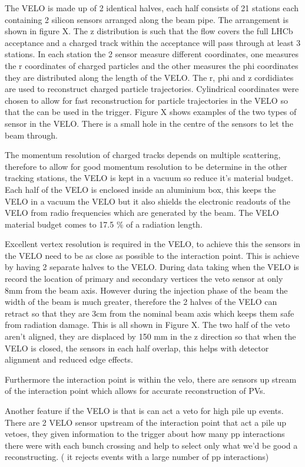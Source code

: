 The VELO is made up of 2 identical halves, each half consists of 21 stations each containing 2 silicon sensors arranged along the beam pipe. The arrangement is shown in figure X. The z distribution is such that the flow covers the full LHCb acceptance and a charged track within the acceptance will pass through at least 3 stations. In each station the 2 sensor measure different coordinates, one measures the r coordinates of charged particles and the other measures the phi coordinates they are distributed along the length of the VELO. The r, phi and z cordidiates are used to reconstruct charged particle trajectories. Cylindrical coordinates were chosen to allow for fast reconstruction for particle trajectories in the VELO so that the can be used in the trigger. Figure X shows examples of the two types of sensor in the VELO. There is a small hole in the centre of the sensors to let the beam through.

The momentum resolution of charged tracks depends on multiple scattering, therefore to allow for good momentum resolution to be determine in the other tracking stations, the VELO is kept in a vacuum so reduce it’s material budget. Each half of the VELO is enclosed inside an aluminium box, this keeps the VELO in a  vacuum the VELO but it also shields the electronic readouts of the VELO from radio frequencies which are generated by the beam. The VELO material budget comes to 17.5 $\%$ of a radiation length.

Excellent vertex resolution is required in the VELO, to achieve this the sensors in the VELO need to be as close as possible to the interaction point. This is achieve by having 2 separate halves to the VELO. During data taking when the VELO is record the location of primary and secondary vertices the veto sensor at only 8mm from the beam axis. However during the injection phase of the beam the width of the beam is much greater, therefore the 2 halves of the VELO can retract so that they are 3cm from the nominal beam axis which keeps them safe from radiation damage. This is all shown in Figure X. The two half of the veto aren’t aligned, they are displaced by 150 mm in the z direction so that when the VELO is closed, the sensors in each half overlap, this helps with detector alignment and reduced edge effects.


Furthermore the interaction point is within the velo, there are sensors up stream of the interaction point which allows for accurate reconstruction of PVs.


Another feature if the VELO is that is can act a veto for high pile up events. There are 2 VELO sensor upstream of the interaction point that act a pile up vetoes, they given information to the trigger about how many pp interactions there were with each bunch crossing and help to select only what we’d be good a reconstructing. ( it rejects events with a large number of pp interactions)

